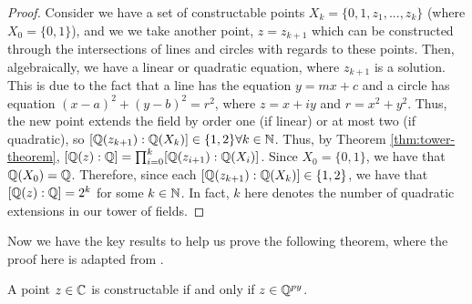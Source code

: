 \begin{proof}  
   Consider we have a set of constructable points $X_k = \{0,1,z_1,...,z_k\}$ (where $X_0=\{0,1\}$), and we we take another point, $z=z_{k+1}$ which can be constructed through the intersections of lines and circles with regards to these points. 
   Then, algebraically, we have a linear or quadratic equation, where $z_{k+1}$ is a solution. This is due to the fact that a line has the equation $y=mx+c$ and a circle has equation $(x-a)^2+(y-b)^2=r^2$, where $z=x+iy$ and $r=x^2+y^2$. Thus, the new point extends the field by order one (if linear) or at most two (if quadratic), so $[\mathbb Q(z_{k+1}):\mathbb Q(X_k)] \in \{1,2\} \forall k \in \mathbb N$. Thus, by Theorem \ref{thm:tower-theorem}, $[\mathbb Q(z):\mathbb Q] = \prod_{i=0}^k [\mathbb Q(z_{i+1}):\mathbb Q(X_i)]$. Since $X_0=\{0,1\}$, we have that $\mathbb Q(X_0) = \mathbb Q$. Therefore, since each $[\mathbb Q(z_{k+1}):\mathbb Q(X_k)] \in \{1,2\}$, we have that $[\mathbb Q(z):\mathbb Q] = 2^k$ for some $k \in \mathbb N$. In fact, $k$ here denotes the number of quadratic extensions in our tower of fields.
\end{proof}


Now we have the key results to help us prove the following theorem, where the proof here is adapted from \cite{constructions-and-galois}.

\begin{theorem}
    A point $z \in \mathbb C$ is constructable if and only if $z \in \mathbb Q^{py}$.
\end{theorem}

